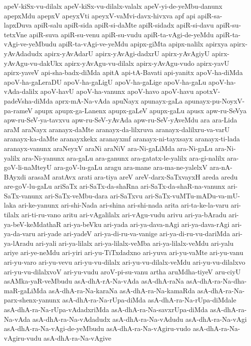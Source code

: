 {apeV-kiSx-vu-dilalx
apeV-kiSx-vu-dilalx-valalx
apeV-yi-de-yeMbu-danunx
apepxMdu
apepxV
apeyxVti
apeyxV-vaMvi-davx-hivxva
apf
api
apiR-sa-lapxDuva
apiR-salu
apiR-sida
apiR-si-daMte
apiR-sidadx
apiR-si-davu
apiR-su-tetxVne
apiR-suva
apiR-su-venu
apiR-su-vudu
apiR-ta-vAgi-de-yeMdu
apiR-ta-vAgi-ve-yeMbudu
apiR-ta-vAgi-ve-yeMdu
apipx-giMta
apipx-nalilx
apirxya
apirx-yAvAdadudx
apirx-yAvAdarU
apirx-yAvAgi-dadxrU
apirx-yAvAgiyU
apirx-yAvAgu-vu-dakUkx
apirx-yAvAgu-vu-dilalx
apirx-yAvAgu-vudo
apirx-yavU
apirx-yaveV
api-sha-badx-diMda
apitA
api-tA-Bavati
api-yanitx
apoV-ha-diMda
apoV-ha-gaLeraDU
apoV-ha-gaLigU
apoV-ha-gaLige
apoV-ha-gaLu
apoV-ha-vAda-dalilx
apoV-havU
apoV-ha-vanunx
apoV-havo
apoV-havu
apotxV-padeVsha-diMda
aprx-mA-Na-vAda
apuNayx
apunayx-gaLa
apunayx-pu-NoyxV-pa-rameV
apupx
apupx-ga-Lanenx
apupx-gaLeV
apupx-gaLu
apusx
apw-ru-SeVya
apw-ru-SeV-ya-tavxvu
apw-ru-SeV-yAvAda
apw-ru-SeV-yAveMdu
ara
ara-Lida
araM
araNayx
aranayx-daMte
aranayx-da-lilxruva
aranayx-dalilxru-va-varU
aranayx-ka-daMte
aranayxkekx
aranayxmf
aranayx-ni-tayxsayx
aranayx-ti-lada
aranayx-vanunx
araNeyxV
araNi
araNiV
ara-Ni-gaLiMda
ara-Ni-gaLu
ara-Ni-yalilx
ara-Ni-yanunx
ara-gaLu
ara-ganunx
ara-gatatx-le-yalilx
ara-gi-nalilx
ara-goV-li-naMteyU
ara-goV-lu-gaLu
aragu
ara-mane
ara-ma-ne-yalelxV
ara-nA-BAyxdi
arasaM
aratAvx
arati
ara-tiya
areV
areV-darx-SaTxvayxH
areda
aredu
are-goV-lu-gaLu
ariSaTx
ari-SaTx-da-shaRna
ari-SaTx-da-shaR-na-vanunx
ari-SaTx-vanunx
ari-SaTx-veMbu-dara
ari-SaTxvu
ari-SaTx-vuMTu-mADu-va-mU-laka
ari-ke-yanunx
ari-shi-Nada
ari-shina
ari-shi-nada
arita
ari-ta-ke-la-varu
ari-tilalx
ari-ti-ru-vano
aritu
ari-vAgalilalx
ari-vAgu-vudu
arivu
ari-ya-bAradu
ari-ya-beV-keMdathaR
ari-ya-beVku
ari-yada
ari-ya-dava-nAgi
ari-ya-dava-rAgi
ari-ya-da-varu
ari-yade
ari-yadeV
ari-ya-di-ru-va-vanige
ari-ya-di-ru-vu-dariMda
ari-ya-lAradu
ari-yali
ari-ya-lilalx
ari-ya-lilalx-veMba
ari-ya-lilalx-veMdu
ari-yalu
ariye
ari-ye-neMdu
ari-yiri
ari-yu-TiTxdadxno
ari-yuva
ari-yu-vaMte
ari-yu-vanu
ari-yu-varo
ari-yu-vevu
ari-yu-vu-dilalx
ari-yu-vu-dilalx-veMdu
ari-yu-vu-dilalxvo
ari-yu-vu-dilalxvoV
ari-yu-vudu
aroV-pi-su-vanu
artha
aruMdha-tiyeV
aru-ciyU
asAMka-yaR-veMbudu
asA-dhA-rA-Na-vAda
asA-dhA-raNa
asA-dhA-ra-Na-dha-maR-gaLiMda
asA-dhA-ra-Na-karaNa
asA-dhA-ra-Na-kamaRda
asA-dhA-ra-Na-parx-shenx-yanunx
asA-dhA-ra-Na-rUpa-diMda
asA-dhA-ra-Na-rUpa-diMdale
asA-dhA-ra-Na-rUpa-vAdadxriMda
asA-dhA-ra-Na-savxrUpa-diMda
asA-dhA-ra-Na-vAda
asA-dhA-ra-Na-vAdadudx
asA-dhA-ra-Na-vAdudu
asA-dhA-ra-Na-vAgi
asA-dhA-ra-Na-vAgi-de-yeMbudu
asA-dhA-ra-Na-vAgiru-vudo
asA-dhA-ra-Na-vAgiru-vudu
asA-dhA-ra-Na-vAgive
}
